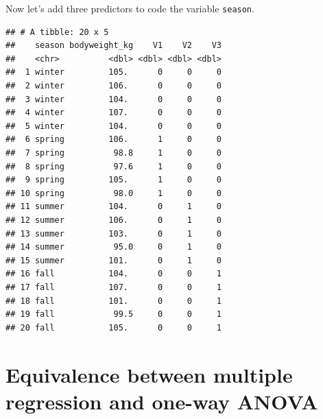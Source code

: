 \documentclass[]{book}
\newenvironment{Shaded}{\begin{snugshade}}{\end{snugshade}}
\newcommand{\CommentTok}[1]{\textcolor[rgb]{0.56,0.35,0.01}{\textit{#1}}}
\newcommand{\DataTypeTok}[1]{\textcolor[rgb]{0.13,0.29,0.53}{#1}}
\newcommand{\DecValTok}[1]{\textcolor[rgb]{0.00,0.00,0.81}{#1}}
\newcommand{\KeywordTok}[1]{\textcolor[rgb]{0.13,0.29,0.53}{\textbf{#1}}}
\newcommand{\NormalTok}[1]{#1}
\newcommand{\OperatorTok}[1]{\textcolor[rgb]{0.81,0.36,0.00}{\textbf{#1}}}
\newcommand{\StringTok}[1]{\textcolor[rgb]{0.31,0.60,0.02}{#1}}
\begin{document}
Now let's add three predictors to code the variable \texttt{season}.

\begin{Shaded}
\end{Shaded}

\begin{verbatim}
## # A tibble: 20 x 5
##    season bodyweight_kg    V1    V2    V3
##    <chr>          <dbl> <dbl> <dbl> <dbl>
##  1 winter         105.      0     0     0
##  2 winter         106.      0     0     0
##  3 winter         104.      0     0     0
##  4 winter         107.      0     0     0
##  5 winter         104.      0     0     0
##  6 spring         106.      1     0     0
##  7 spring          98.8     1     0     0
##  8 spring          97.6     1     0     0
##  9 spring         105.      1     0     0
## 10 spring          98.0     1     0     0
## 11 summer         104.      0     1     0
## 12 summer         106.      0     1     0
## 13 summer         103.      0     1     0
## 14 summer          95.0     0     1     0
## 15 summer         101.      0     1     0
## 16 fall           104.      0     0     1
## 17 fall           107.      0     0     1
## 18 fall           101.      0     0     1
## 19 fall            99.5     0     0     1
## 20 fall           105.      0     0     1
\end{verbatim}

\hypertarget{equivalence-between-multiple-regression-and-one-way-anova}{%
\section{Equivalence between multiple regression and one-way ANOVA}\label{equivalence-between-multiple-regression-and-one-way-anova}}
\end{document}
